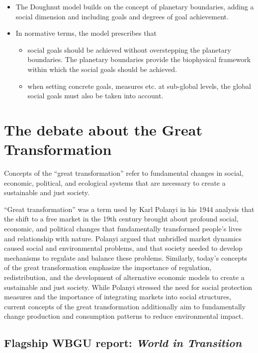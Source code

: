 \documentclass[
  a4paper,
  DIV=11,
  numbers=noendperiod,
  oneside,
  openany]{scrreprt}
\begin{document}
\begin{itemize}
\item
  The Doughnut model builds on the concept of planetary boundaries,
  adding a social dimension and including goals and degrees of goal
  achievement.
\item
  In normative terms, the model prescribes that

  \begin{itemize}
  \item
    social goals should be achieved without overstepping the planetary
    boundaries. The planetary boundaries provide the biophysical
    framework within which the social goals should be achieved.
  \item
    when setting concrete goals, measures etc. at sub-global levels, the
    global social goals must also be taken into account.
  \end{itemize}
\end{itemize}

\section{The debate about the Great
Transformation}\label{the-debate-about-the-great-transformation}

Concepts of the ``great transformation'' refer to fundamental changes in
social, economic, political, and ecological systems that are necessary
to create a sustainable and just society.

``Great transformation'' was a term used by Karl Polanyi in his 1944
analysis that the shift to a free market in the 19th century brought
about profound social, economic, and political changes that
fundamentally transformed people's lives and relationship with nature.
Polanyi argued that unbridled market dynamics caused social and
environmental problems, and that society needed to develop mechanisms to
regulate and balance these problems. Similarly, today's concepts of the
great transformation emphasize the importance of regulation,
redistribution, and the development of alternative economic models to
create a sustainable and just society. While Polanyi stressed the need
for social protection measures and the importance of integrating markets
into social structures, current concepts of the great transformation
additionally aim to fundamentally change production and consumption
patterns to reduce environmental impact.

\subsection{\texorpdfstring{Flagship WBGU report: \emph{World in
Transition}}{Flagship WBGU report: World in Transition}}\label{flagship-wbgu-report-world-in-transition}
\end{document}
